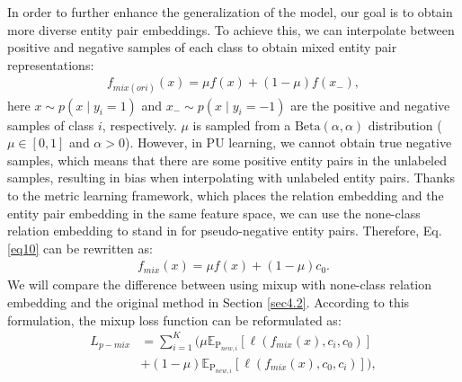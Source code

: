\documentclass[11pt]{article}
\begin{document}
In order to further enhance the generalization of the model, our goal is to obtain more diverse entity pair embeddings. To achieve this, we can interpolate between positive and negative samples of each class to obtain mixed entity pair representations:
\begin{equation}
\begin{aligned}\label{eq10}
f_{mix(ori)}(x)=\mu f(x)+(1-\mu) f(x_{-}),
\end{aligned}
\end{equation}
here $x \sim p(x \mid y_{i}=1)$ and $x_{-} \sim p(x \mid y_{i}=-1)$ are the positive and negative samples of class $i$, respectively. $\mu$ is sampled from
a $\mathrm{Beta}(\alpha, \alpha)$ distribution ($\mu \in [0, 1]$ and $\alpha > 0$). However, in PU learning, we cannot obtain true negative samples, which means that there are some positive entity pairs in the unlabeled samples, resulting in bias when interpolating with unlabeled entity pairs. Thanks to the metric learning framework, which places the relation embedding and the entity pair embedding in the same feature space, we can use the none-class relation embedding to stand in for pseudo-negative entity pairs. Therefore, Eq.\ref{eq10} can be rewritten as:
\begin{equation}
\begin{aligned}\label{eq11}
f_{mix}(x)=\mu f(x)+(1-\mu) c_{0}.
\end{aligned}
\end{equation}
We will compare the difference between using mixup with none-class relation embedding and the original method in Section \ref{sec4.2}.
According to this formulation, the mixup loss function can be reformulated as:
\begin{equation}
\begin{aligned}\label{eq12}
L_{p-mix} &= \sum_{i=1}^{K} (\mu \mathbb{E}_{\mathrm{P}_{new,i}}[ \ell(f_{mix}(x), c_{i}, c_{0})] \\&+ (1-\mu) \mathbb{E}_{\mathrm{P}_{new,i}}[ \ell(f_{mix}(x), c_{0}, c_{i})]),
\end{aligned}
\end{equation}
\end{document}
